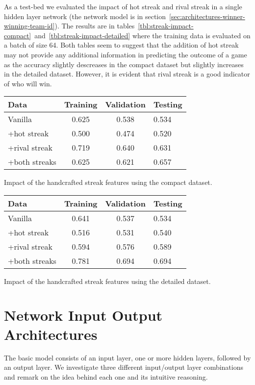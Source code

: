 \documentclass{article} %
\begin{document}
As a test-bed we evaluated the impact of hot streak and rival streak in a single hidden layer network (the network model is in section~\ref{sec:architectures-winner-winning-team-id}).  The results are in tables~\ref{tbl:streak-impact-compact}~and~\ref{tbl:streak-impact-detailed} where the training data is evaluated on a batch of size 64.  Both tables seem to suggest that the addition of hot streak may not provide any additional information in predicting the outcome of a game as the accuracy slightly descreases in the compact dataset but slightly increases in the detailed dataset.  However, it is evident that rival streak is a good indicator of who will win.


\begin{tabular}{|l|c|c|}
\hline
Data & Training & Validation & Testing\\
\hline
Vanilla & 0.625 & 0.538 & 0.534\\
+hot streak & 0.500 & 0.474 & 0.520\\
+rival streak & 0.719 & 0.640 & 0.631\\
+both streaks & 0.625 & 0.621 & 0.657\\
\end{tabular}
\caption{Impact of the handcrafted streak features using the compact dataset.}
\label{tbl:streak-impact-detaled}


\begin{tabular}{|l|c|c|}
\hline
Data & Training & Validation & Testing\\
\hline
Vanilla & 0.641 & 0.537 & 0.534\\
+hot streak & 0.516 & 0.531 & 0.540\\
+rival streak & 0.594 & 0.576 & 0.589\\
+both streaks & 0.781 & 0.694 & 0.694\\
\end{tabular}
\caption{Impact of the handcrafted streak features using the detailed dataset.}
\label{tbl:streak-impact-detaled}



\section{Network Input Output Architectures}

The basic model consists of an input layer, one or more hidden layers, followed by an output layer.  We investigate three different input/output layer combinations and remark on the idea behind each one and its intuitive reasoning.
\end{document}
